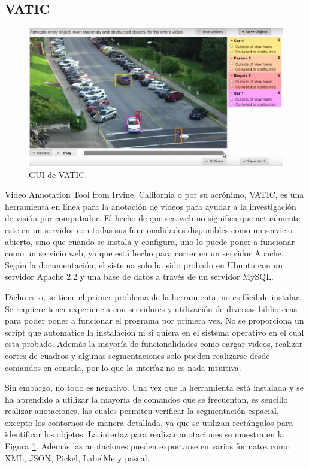 \subsection{VATIC}

\begin{figure}
	\includegraphics[width=1\linewidth]{images/vatic}
	\caption{GUI de VATIC.} \label{fig:vaticGUI}
\end{figure}

Video Annotation Tool from Irvine, California o por su acrónimo, VATIC, es una herramienta en línea para la anotación de videos para ayudar a la investigación de visión por computador. El hecho de que sea web no significa que actualmente este en un servidor con todas sus funcionalidades disponibles como un servicio abierto, sino que cuando se instala y configura, uno lo puede poner a funcionar como un servicio web, ya que está hecho para correr en un servidor Apache. Según la documentación, el sistema solo ha sido probado en Ubuntu con un servidor Apache 2.2 y una base de datos a través de un servidor MySQL.

Dicho esto, se tiene el primer problema de la herramienta, no es fácil de instalar. Se requiere tener experiencia con servidores y utilización de diversas bibliotecas para poder poner a funcionar el programa por primera vez. No se proporciona un script que automatice la instalación ni si quiera en el sistema operativo en el cual esta probado. Además la mayoría de funcionalidades como cargar videos, realizar cortes de cuadros y algunas segmentaciones solo pueden realizarse desde comandos en consola, por lo que la interfaz no es nada intuitiva.

Sin embargo, no todo es negativo. Una vez que la herramienta está instalada y se ha aprendido a utilizar la mayoría de comandos que se frecuentan, es sencillo realizar anotaciones, las cuales permiten verificar la segmentación espacial, excepto los contornos de manera detallada, ya que se utilizan rectángulos para identificar los objetos. La interfaz para realizar anotaciones se muestra en la Figura \ref{fig:vaticGUI}. Además las anotaciones pueden exportarse en varios formatos como XML, JSON, Pickel, LabelMe y pascal.


